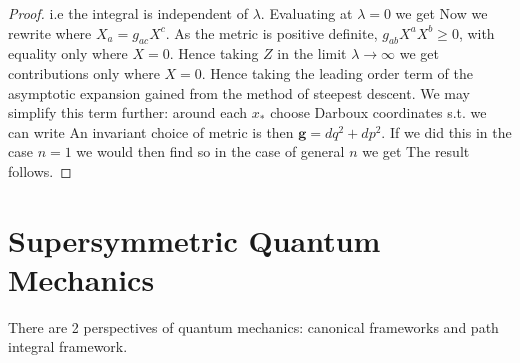 \documentclass{article}
\begin{document}
\begin{proof}
{}
i.e the integral is independent of $\lambda$. Evaluating at $\lambda=0$ we get 
Now we rewrite 
where $X_a = g_{ac}X^c$. As the metric is positive definite, $g_{ab}X^a X^b \geq 0$, with equality only where $X=0$. Hence taking $Z$ in the limit $\lambda \to \infty$ we get contributions only where $X = 0$. Hence taking the leading order term of the asymptotic expansion gained from the method of steepest descent.
We may simplify this term further: around each $x_\ast$ choose Darboux coordinates s.t. we can write 
An invariant choice of metric is then $\bm{g} = dq^2 + dp^2$. If we did this in the case $n=1$ we would then find 
so in the case of general $n$ we get
The result follows. 
\end{proof}
\section{Supersymmetric Quantum Mechanics}
There are 2 perspectives of quantum mechanics: canonical frameworks and path integral framework. 
\end{document}
